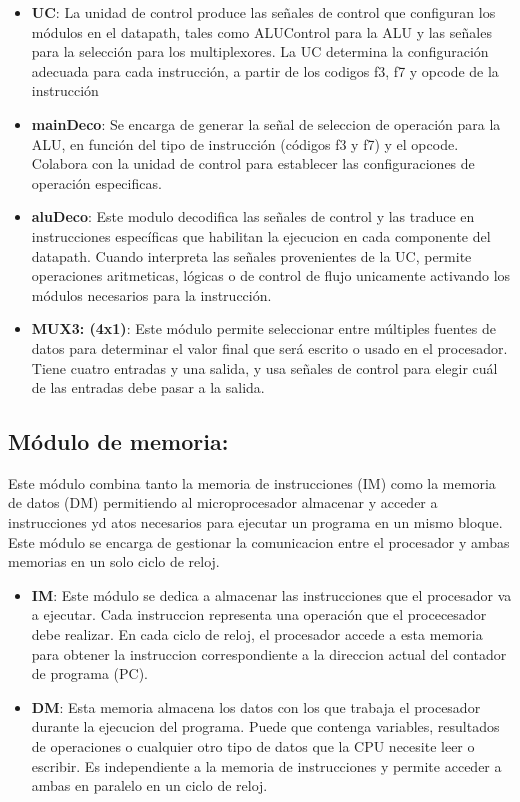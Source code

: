 \documentclass{article}
\begin{document}
\begin{itemize}
\item \textbf{UC}: La unidad de control produce las señales de control que configuran los módulos en el datapath, tales como ALUControl para la ALU y las señales para la selección para los multiplexores. La UC determina la configuración adecuada para cada instrucción, a partir de los codigos f3, f7 y opcode de la instrucción
\item \textbf{mainDeco}: Se encarga de generar la señal de seleccion de operación para la ALU, en función del tipo de instrucción (códigos f3 y f7) y el opcode. Colabora con la unidad de control para establecer las configuraciones de operación especificas. 
\item \textbf{aluDeco}: Este modulo decodifica las señales de control y las traduce en instrucciones específicas que habilitan la ejecucion en cada componente del datapath. Cuando interpreta las señales provenientes de la UC, permite operaciones aritmeticas, lógicas o de control de flujo unicamente activando los módulos necesarios para la instrucción.
\item \textbf {MUX3: (4x1)}: Este módulo permite seleccionar entre múltiples fuentes de datos para determinar el valor final que será escrito o usado en el procesador. Tiene cuatro entradas y una salida, y usa señales de control para elegir cuál de las entradas debe pasar a la salida.
\end{itemize}

\newpage

\subsection{Módulo de memoria:}
Este módulo combina tanto la memoria de instrucciones  (IM) como la memoria de datos (DM) permitiendo al microprocesador almacenar y acceder a instrucciones yd atos necesarios para ejecutar un programa en un mismo bloque. Este módulo se encarga de gestionar la comunicacion entre el procesador y ambas memorias en un solo ciclo de reloj.
\begin{itemize}
\item \textbf{IM}: Este módulo se dedica a almacenar las instrucciones que el procesador va a ejecutar. Cada instruccion representa una operación que el procecesador debe realizar. En cada ciclo de reloj, el procesador accede a esta memoria para obtener la instruccion correspondiente a la direccion actual del contador de programa (PC).
\item \textbf{DM}: Esta memoria almacena los datos con los que trabaja el procesador durante la ejecucion del programa. Puede que contenga variables, resultados de operaciones o cualquier otro tipo de datos que la CPU necesite leer o escribir. Es independiente a la memoria de instrucciones y permite acceder a ambas en paralelo en un ciclo de reloj.
\end{itemize}
\end{document}
